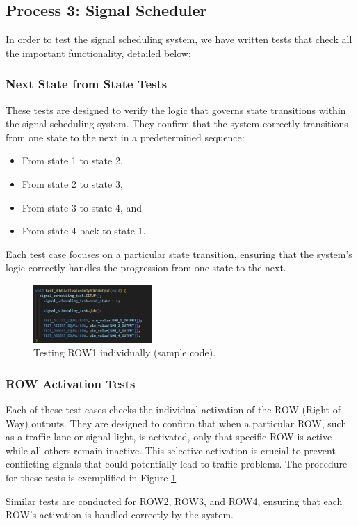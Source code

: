 \subsection{Process 3: Signal Scheduler}
\label{subsec:signal_scheduler}

In order to test the signal scheduling system, we have written tests that check all the important functionality, detailed below:

\subsubsection{Next State from State Tests}
\label{subsubsec:next_state_from_state_tests}

These tests are designed to verify the logic that governs state transitions within the signal scheduling system. They confirm that the system correctly transitions from one state to the next in a predetermined sequence:
\begin{itemize}
    \item From state 1 to state 2,
    \item From state 2 to state 3,
    \item From state 3 to state 4, and
    \item From state 4 back to state 1.
\end{itemize}
Each test case focuses on a particular state transition, ensuring that the system's logic correctly handles the progression from one state to the next.

\begin{figure}[ht]
    \centering
    \includegraphics[width=0.4\textwidth]{images/screenshot_code_test.png}
    \caption{Testing ROW1 individually (sample code).}
    \label{fig:row1_test}
\end{figure}

\subsubsection{ROW Activation Tests}
\label{subsubsec:row_activation_tests}

Each of these test cases checks the individual activation of the ROW (Right of Way) outputs. They are designed to confirm that when a particular ROW, such as a traffic lane or signal light, is activated, only that specific ROW is active while all others remain inactive. This selective activation is crucial to prevent conflicting signals that could potentially lead to traffic problems. The procedure for these tests is exemplified in Figure \ref{fig:row1_test}

Similar tests are conducted for ROW2, ROW3, and ROW4, ensuring that each ROW's activation is handled correctly by the system.
